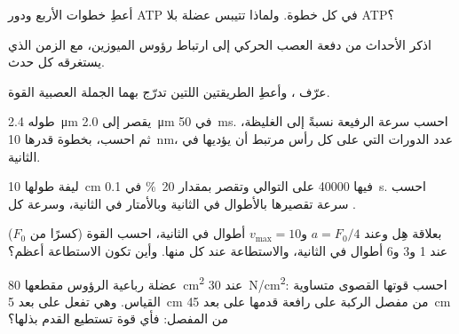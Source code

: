 \begin{exercise}[$\star$]\label{exo:b2:muscle-movement:2}
أعطِ خطوات  الأربع ودور ATP
في كل خطوة. ولماذا تتيبس عضلة بلا ATP؟
\end{exercise}

\begin{exercise}[$\star$]\label{exo:b2:muscle-movement:3}
اذكر الأحداث من دفعة العصب الحركي إلى ارتباط
رؤوس الميوزين، مع الزمن الذي يستغرقه كل حدث.
\end{exercise}

\begin{exercise}[$\star$]\label{exo:b2:muscle-movement:4}
عرّف   ، وأعطِ الطريقتين اللتين
تدرّج بهما الجملة العصبية القوة.
\end{exercise}

\begin{exercise}[$\star\star$]\label{exo:b2:muscle-movement:5}
 طوله \qty{2.4}{\micro m} يقصر إلى \qty{2.0}{\micro m} في
\qty{50}{ms}. احسب سرعة  الرفيعة
نسبةً إلى الغليظة، ثم احسب، بخطوة قدرها \qty{10}{nm}، عدد
الدورات التي على كل رأس مرتبط أن يؤديها في الثانية.
\end{exercise}

\begin{exercise}[$\star\star$]\label{exo:b2:muscle-movement:6}
ليفة طولها \qty{10}{cm} فيها \num{40000}  على التوالي
وتقصر بمقدار \qty{20}{\%} في \qty{0.1}{s}. احسب سرعة تقصيرها
بالأطوال في الثانية وبالأمتار في الثانية، وسرعة
كل .
\end{exercise}

\begin{exercise}[$\star\star$]\label{exo:b2:muscle-movement:7}
بعلاقة هِل وعند $a = F_0/4$ و$v_{\max} = 10$ أطوال في
الثانية، احسب القوة (كسرًا من $F_0$) عند 1 و3 و6
أطوال في الثانية، والاستطاعة عند كل منها. وأين تكون الاستطاعة أعظم؟
\end{exercise}

\begin{exercise}[$\star\star$]\label{exo:b2:muscle-movement:8}
عضلة رباعية الرؤوس مقطعها \qty{80}{cm^2} عند \qty{30}{N/cm^2}:
احسب قوتها القصوى متساوية القياس. وهي تفعل على بعد \qty{5}{cm} من
مفصل الركبة على رافعة قدمها على بعد \qty{45}{cm} من المفصل:
فأي قوة تستطيع القدم بذلها؟
\end{exercise}


